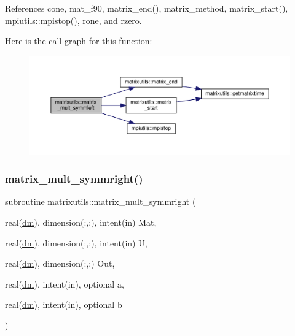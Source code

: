 References cone, mat\+\_\+f90, matrix\+\_\+end(), matrix\+\_\+method, matrix\+\_\+start(), mpiutils\+::mpistop(), rone, and rzero.

Here is the call graph for this function\+:
\nopagebreak
\begin{figure}[H]
\begin{center}
\leavevmode
\includegraphics[width=350pt]{namespacematrixutils_ab4f1087b56f3198b3d84c8ebf1cdd580_cgraph}
\end{center}
\end{figure}
\mbox{\label{namespacematrixutils_a97a6a772baa3485aaddba50623e50673}} 
\subsubsection{\texorpdfstring{matrix\+\_\+mult\+\_\+symmright()}{matrix\_mult\_symmright()}}
{\footnotesize\ttfamily subroutine matrixutils\+::matrix\+\_\+mult\+\_\+symmright (\begin{DoxyParamCaption}\item[{real(\mbox{\hyperlink{namespacematrixutils_a7bdc564986ea4d90f51201c75606ef3d}{dm}}), dimension(\+:,\+:), intent(in)}]{Mat,  }\item[{real(\mbox{\hyperlink{namespacematrixutils_a7bdc564986ea4d90f51201c75606ef3d}{dm}}), dimension(\+:,\+:), intent(in)}]{U,  }\item[{real(\mbox{\hyperlink{namespacematrixutils_a7bdc564986ea4d90f51201c75606ef3d}{dm}}), dimension(\+:,\+:)}]{Out,  }\item[{real(\mbox{\hyperlink{namespacematrixutils_a7bdc564986ea4d90f51201c75606ef3d}{dm}}), intent(in), optional}]{a,  }\item[{real(\mbox{\hyperlink{namespacematrixutils_a7bdc564986ea4d90f51201c75606ef3d}{dm}}), intent(in), optional}]{b }\end{DoxyParamCaption})}



